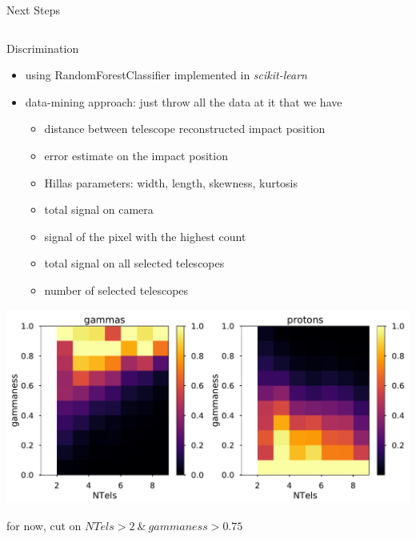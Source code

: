 \documentclass[8pt]{beamer}
\begin{document}
\begin{frame}{Next Steps}
\begin{columns}
        \end{columns}
    \end{frame}

    \begin{frame}{Discrimination}

        \centering

        \begin{itemize}
            \item using RandomForestClassifier implemented in \emph{scikit-learn}
            \item data-mining approach: just throw all the data at it that we have
                \begin{itemize}
                    \item distance between telescope reconstructed impact position
                    \item error estimate on the impact position
                    \item Hillas parameters: width, length, skewness, kurtosis
                    \item total signal on camera
                    \item signal of the pixel with the highest count
                    \item total signal on all selected telescopes
                    \item number of selected telescopes
                \end{itemize}
        \end{itemize}

        \pause

        \includegraphics[width=.7\textwidth]{pics/gammaness_gamma_proton_tail}

        \pause

        for now, cut on $NTels > 2 \ \&\ gammaness > 0.75$
    \end{frame}
\end{document}

